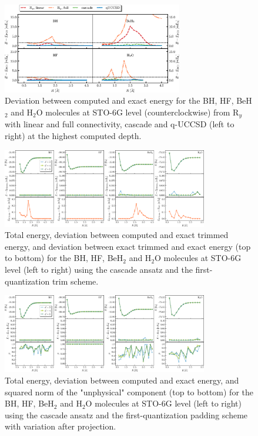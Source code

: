 \documentclass[aps,pra,twocolumn]{revtex4-2}
\begin{document}
\begin{figure}[t!]
\includegraphics[width=0.7\textwidth]{../figures/second_quantization_comparison/second_quantization_comparison.eps}
\caption{Deviation between computed and exact energy for the BH, HF, BeH$_2$ and H$_2$O molecules at STO-6G level (counterclockwise) from R$_y$ with linear and full connectivity, 
cascade and q-UCCSD (left to right) at the highest computed depth.}
\label{figure:second_h2o}
\end{figure} 

\begin{figure}[t!]
\includegraphics[width=0.8\textwidth]{../figures/first_quantization_trim/first_quantization_trim.eps}
\caption{Total energy, deviation between computed and exact trimmed energy, and deviation between exact trimmed and exact energy (top to bottom) for the BH, HF, BeH$_2$ and H$_2$O molecules at STO-6G level (left to right) using the cascade ansatz and the first-quantization trim scheme.}
\label{figure:first_trim}
\end{figure} 

\begin{figure}[t!]
\includegraphics[width=0.8\textwidth]{../figures/first_quantization_pad_vap_cascade/first_quantization_pad_vap_cascade.eps}
\caption{Total energy, deviation between computed and exact energy, and squared norm of the "unphysical" component (top to bottom) 
for the BH, HF, BeH$_2$ and H$_2$O molecules at STO-6G level (left to right) using the cascade ansatz and the first-quantization padding scheme with variation after projection.}
\label{figure:first_pad_vap_cascade}
\end{figure} 
\end{document}
